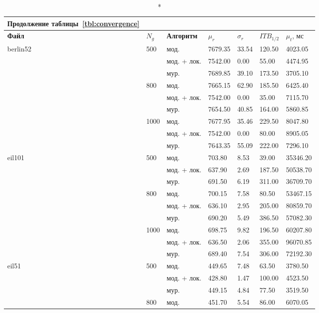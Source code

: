 \begin{longtable}{|p{}|p{}|p{}|p{}|p{}|p{}|p{}|}
	\caption*{Продолжение таблицы~\ref{tbl:convergence}} \\
	\hline
	\textbf{Файл} & $N_g$ & \textbf{Алгоритм} &  $\mu_r$ & $\sigma_r$ & $ITB_{1/2}$ & $\mu_{t}$, мс \\
	\hline
	\endhead
	\hline
	\endfoot
	\endlastfoot
	\hline
	berlin52 & 500 & мод. & 7679.35 & 33.54 & 120.50 & 4023.05 \\
	\cline{3-7}
	& & мод. + лок. & 7542.00 & 0.00 & 55.00 & 4474.95 \\
	\cline{3-7}
	& & мур. & 7689.85 & 39.10 & 173.50 & 3705.10 \\
	\cline{2-7}
	& 800 & мод. & 7665.15 & 62.90 & 185.50 & 6425.40 \\
	\cline{3-7}
	& & мод. + лок. & 7542.00 & 0.00 & 35.00 & 7115.70 \\
	\cline{3-7}
	& & мур. & 7654.50 & 40.85 & 164.00 & 5860.85 \\
	\cline{2-7}
	& 1000 & мод. & 7677.95 & 35.46 & 229.50 & 8047.80 \\
	\cline{3-7}
	& & мод. + лок. & 7542.00 & 0.00 & 80.00 & 8905.05 \\
	\cline{3-7}
	& & мур. & 7643.35 & 55.09 & 222.00 & 7296.10 \\
	\hline
	eil101 & 500 & мод. & 703.80 & 8.53 & 39.00 & 35346.20 \\
	\cline{3-7}
	& & мод. + лок. & 637.90 & 2.69 & 187.50 & 50538.70 \\
	\cline{3-7}
	& & мур. & 691.50 & 6.19 & 311.00 & 36709.70 \\
	\cline{2-7}
	& 800 & мод. & 700.15 & 7.58 & 80.50 & 53467.15 \\
	\cline{3-7}
	& & мод. + лок. & 636.10 & 2.95 & 205.00 & 80859.70 \\
	\cline{3-7}
	& & мур. & 690.20 & 5.49 & 386.50 & 57082.30 \\
	\cline{2-7}
	& 1000 & мод. & 698.75 & 9.82 & 196.50 & 60207.80 \\
	\cline{3-7}
	& & мод. + лок. & 636.50 & 2.06 & 355.00 & 96070.85 \\
	\cline{3-7}
	& & мур. & 689.40 & 7.54 & 306.00 & 72192.30 \\
	\hline
	eil51 & 500 & мод. & 449.65 & 7.48 & 63.50 & 3780.50 \\
	\cline{3-7}
	& & мод. + лок. & 428.80 & 1.47 & 100.00 & 4523.50 \\
	\cline{3-7}
	& & мур. & 449.15 & 4.84 & 77.50 & 3519.50 \\
	\cline{2-7}
	& 800 & мод. & 451.70 & 5.54 & 86.00 & 6070.05 \\

\end{longtable}
